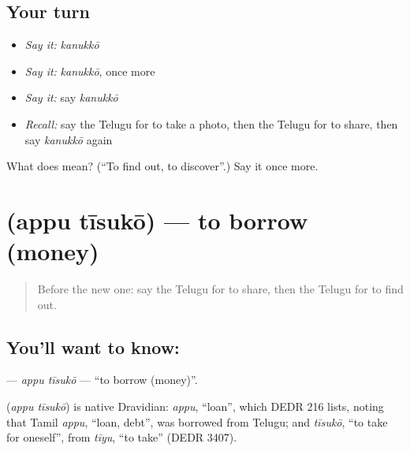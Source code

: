 \subsection*{Your turn}
\begin{itemize}
\raggedright
  \item \emph{Say it:} \emph{kanukkō}
  \item \emph{Say it:} \emph{kanukkō}, once more
  \item \emph{Say it:} say \emph{kanukkō}
  \item \emph{Recall:} say the Telugu for to take a photo, then the Telugu for to share, then say \emph{kanukkō} again
\end{itemize}

\begin{tcolorbox}[breakable,colback=teal!4,colframe=teal!35!black,title={Before you move on}]
What does  mean? (\textquotedblleft{}To find out, to discover\textquotedblright{}.) Say it once more.
\end{tcolorbox}
\section[\texorpdfstring{\te{అప్పు} \te{తీసుకో} (appu tīsukō)}{అప్పు తీసుకో (appu tīsukō)}]{  (appu tīsukō) — to borrow (money)}

\label{lesson:TE-C205-appu-tisuko}



\begin{quote}
Before the new one: say the Telugu for to share, then the Telugu for to find out.
\end{quote}

\subsection*{You'll want to know:  }
\textbf{ } — \emph{appu tīsukō} — \textquotedblleft{}to borrow (money)\textquotedblright{}.

\begin{cousinweb}
\textbf{ } (\emph{appu tīsukō}) is native Dravidian: \emph{appu}, \textquotedblleft{}loan\textquotedblright{}, which DEDR 216 lists, noting that Tamil \emph{appu}, \textquotedblleft{}loan, debt\textquotedblright{}, was borrowed from Telugu; and \emph{tīsukō}, \textquotedblleft{}to take for oneself\textquotedblright{}, from \emph{tīyu}, \textquotedblleft{}to take\textquotedblright{} (DEDR 3407).
\end{cousinweb}

